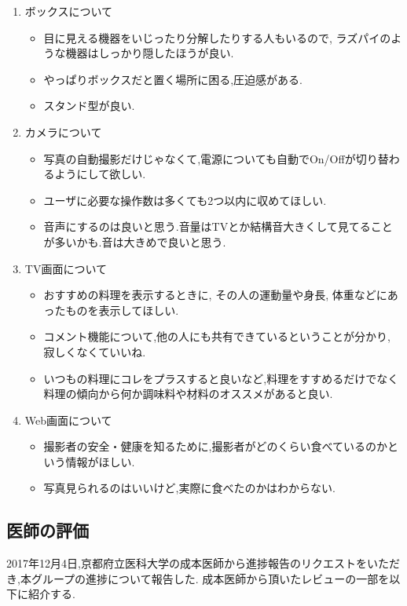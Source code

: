 \documentclass[../report]{subfiles}
\begin{document}
\begin{enumerate}
    \item[] ボックスについて
\begin{itemize}
    \item 目に見える機器をいじったり分解したりする人もいるので, ラズパイのような機器はしっかり隠したほうが良い.
    \item やっぱりボックスだと置く場所に困る,圧迫感がある.
    \item スタンド型が良い.
\end{itemize}

    \item[] カメラについて
\begin{itemize}
    \item 写真の自動撮影だけじゃなくて,電源についても自動でOn/Offが切り替わるようにして欲しい.
    \item ユーザに必要な操作数は多くても2つ以内に収めてほしい.
    \item 音声にするのは良いと思う.音量はTVとか結構音大きくして見てることが多いかも.音は大きめで良いと思う.
\end{itemize}

    \item[] TV画面について
\begin{itemize}
    \item おすすめの料理を表示するときに, その人の運動量や身長, 体重などにあったものを表示してほしい.
    \item コメント機能について,他の人にも共有できているということが分かり, 寂しくなくていいね.
    \item いつもの料理にコレをプラスすると良いなど,料理をすすめるだけでなく料理の傾向から何か調味料や材料のオススメがあると良い.
\end{itemize}

    \item[] Web画面について
\begin{itemize}
    \item 撮影者の安全・健康を知るために,撮影者がどのくらい食べているのかという情報がほしい.
    \item 写真見られるのはいいけど,実際に食べたのかはわからない.
\end{itemize}
\end{enumerate}

\subsection{医師の評価}
2017年12月4日,京都府立医科大学の成本医師から進捗報告のリクエストをいただき,本グループの進捗について報告した.
成本医師から頂いたレビューの一部を以下に紹介する.
\end{document}
